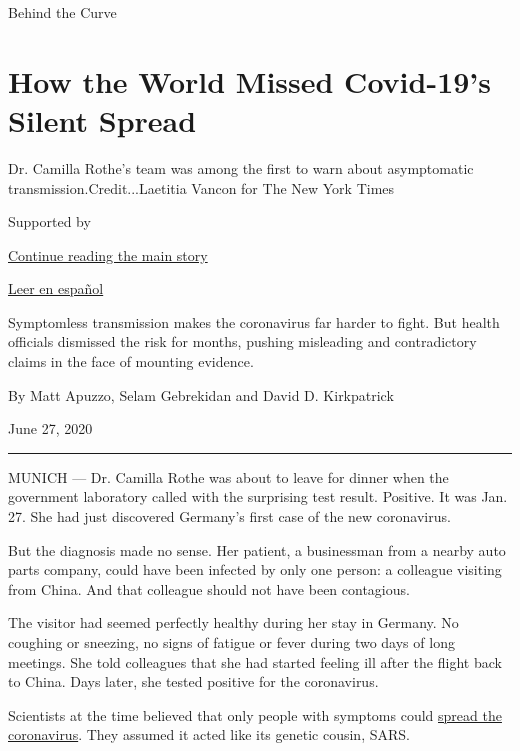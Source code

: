 Behind the Curve

\hypertarget{how-the-world-missed-covid-19s-silent-spread}{%
\section{How the World Missed Covid-19's Silent
Spread}\label{how-the-world-missed-covid-19s-silent-spread}}

Dr. Camilla Rothe's team was among the first to warn about asymptomatic
transmission.Credit...Laetitia Vancon for The New York Times

Supported by

\protect\hyperlink{after-sponsor}{Continue reading the main story}

\href{https://www.nytimes.com/es/2020/06/29/espanol/mundo/coronavirus-asintomaticos.html}{Leer
en español}

Symptomless transmission makes the coronavirus far harder to fight. But
health officials dismissed the risk for months, pushing misleading and
contradictory claims in the face of mounting evidence.

By Matt Apuzzo, Selam Gebrekidan and David D. Kirkpatrick

June 27, 2020

\begin{center}\rule{0.5\linewidth}{\linethickness}\end{center}

MUNICH --- Dr. Camilla Rothe was about to leave for dinner when the
government laboratory called with the surprising test result. Positive.
It was Jan. 27. She had just discovered Germany's first case of the new
coronavirus.

But the diagnosis made no sense. Her patient, a businessman from a
nearby auto parts company, could have been infected by only one person:
a colleague visiting from China. And that colleague should not have been
contagious.

The visitor had seemed perfectly healthy during her stay in Germany. No
coughing or sneezing, no signs of fatigue or fever during two days of
long meetings. She told colleagues that she had started feeling ill
after the flight back to China. Days later, she tested positive for the
coronavirus.

Scientists at the time believed that only people with symptoms could
\href{https://www.nytimes.com/2020/07/21/health/coronavirus-infections-us.html}{spread
the coronavirus}. They assumed it acted like its genetic cousin, SARS.

